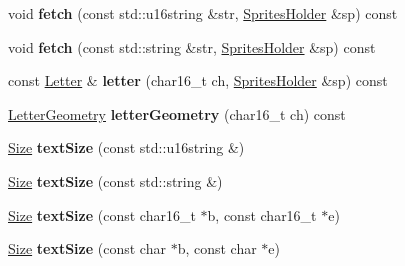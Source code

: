 \begin{DoxyCompactItemize}
\item 
\hypertarget{class_tempest_1_1_font_a6ec302204706267e8984cb9715a85427}{void {\bfseries fetch} (const std\+::u16string \&str, \hyperlink{class_tempest_1_1_sprites_holder}{Sprites\+Holder} \&sp) const }\label{class_tempest_1_1_font_a6ec302204706267e8984cb9715a85427}

\item 
\hypertarget{class_tempest_1_1_font_afc66f42b1ee2ea266da838ce6d1ec93e}{void {\bfseries fetch} (const std\+::string \&str, \hyperlink{class_tempest_1_1_sprites_holder}{Sprites\+Holder} \&sp) const }\label{class_tempest_1_1_font_afc66f42b1ee2ea266da838ce6d1ec93e}

\item 
\hypertarget{class_tempest_1_1_font_afd325296e8bfa69a11004ddce21a3317}{const \hyperlink{struct_tempest_1_1_font_element_1_1_letter}{Letter} \& {\bfseries letter} (char16\+\_\+t ch, \hyperlink{class_tempest_1_1_sprites_holder}{Sprites\+Holder} \&sp) const }\label{class_tempest_1_1_font_afd325296e8bfa69a11004ddce21a3317}

\item 
\hypertarget{class_tempest_1_1_font_af2ba7bbc0fa44d5ff458f92853ed5d77}{\hyperlink{struct_tempest_1_1_font_element_1_1_letter_geometry}{Letter\+Geometry} {\bfseries letter\+Geometry} (char16\+\_\+t ch) const }\label{class_tempest_1_1_font_af2ba7bbc0fa44d5ff458f92853ed5d77}

\item 
\hypertarget{class_tempest_1_1_font_a8a18f6ceacad37ddfb418d2d9a7dbe76}{\hyperlink{struct_tempest_1_1_size}{Size} {\bfseries text\+Size} (const std\+::u16string \&)}\label{class_tempest_1_1_font_a8a18f6ceacad37ddfb418d2d9a7dbe76}

\item 
\hypertarget{class_tempest_1_1_font_ac7543ca4e64d5aee3f02679709b4ac1c}{\hyperlink{struct_tempest_1_1_size}{Size} {\bfseries text\+Size} (const std\+::string \&)}\label{class_tempest_1_1_font_ac7543ca4e64d5aee3f02679709b4ac1c}

\item 
\hypertarget{class_tempest_1_1_font_aed3861c4b014e7e2a0f2738adf2f0cc5}{\hyperlink{struct_tempest_1_1_size}{Size} {\bfseries text\+Size} (const char16\+\_\+t $\ast$b, const char16\+\_\+t $\ast$e)}\label{class_tempest_1_1_font_aed3861c4b014e7e2a0f2738adf2f0cc5}

\item 
\hypertarget{class_tempest_1_1_font_a5aa8845660752a9c9c9af54a62e5101e}{\hyperlink{struct_tempest_1_1_size}{Size} {\bfseries text\+Size} (const char $\ast$b, const char $\ast$e)}\label{class_tempest_1_1_font_a5aa8845660752a9c9c9af54a62e5101e}


\end{DoxyCompactItemize}
